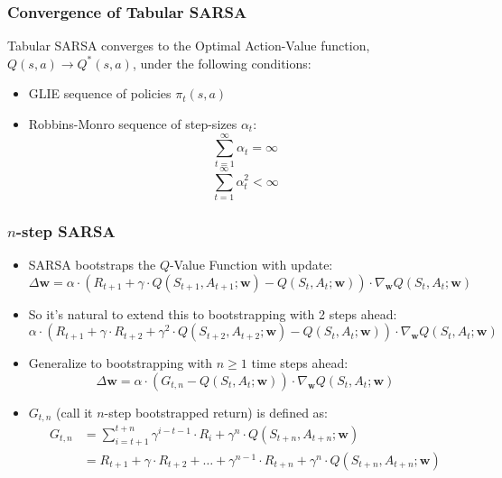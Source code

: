 \documentclass[handout]{beamer}
\begin{document}
\begin{frame}
\frametitle{Convergence of Tabular SARSA}
\pause
\begin{theorem}
Tabular SARSA converges to the Optimal Action-Value function, $Q(s,a) \rightarrow Q^*(s,a)$, under the following conditions:
\pause
\begin{itemize}[<+->]
\item GLIE sequence of policies $\pi_t(s,a)$
\item Robbins-Monro sequence of step-sizes $\alpha_t$:
$$\sum_{t=1}^{\infty} \alpha_t = \infty$$
$$\sum_{t=1}^{\infty} \alpha_t^2 < \infty$$
\end{itemize}
\end{theorem}
\end{frame}


\begin{frame}
\frametitle{$n$-step SARSA}
\pause
\begin{itemize}[<+->]
\item SARSA bootstraps the $Q$-Value Function with update:
$$\Delta \bm{w} =  \alpha \cdot (R_{t+1} + \gamma \cdot Q(S_{t+1}, A_{t+1}; \bm{w}) - Q(S_t,A_t; \bm{w})) \cdot \nabla_{\bm{w}} Q(S_t, A_t; \bm{w})$$
\item So it's natural to extend this to bootstrapping with 2 steps ahead:
$$\alpha \cdot (R_{t+1} + \gamma \cdot R_{t+2} + \gamma^2 \cdot Q(S_{t+2}, A_{t+2}; \bm{w}) - Q(S_t,A_t; \bm{w})) \cdot \nabla_{\bm{w}} Q(S_t, A_t; \bm{w})$$
\item Generalize to bootstrapping with $n \geq 1$ time steps ahead:
$$\Delta \bm{w} =  \alpha \cdot (G_{t,n} - Q(S_t,A_t; \bm{w})) \cdot \nabla_{\bm{w}} Q(S_t, A_t; \bm{w})$$
\item $G_{t,n}$ (call it $n$-step bootstrapped return) is defined as:
\begin{align*}
G_{t,n} & = \sum_{i=t+1}^{t+n} \gamma^{i-t-1} \cdot R_i  + \gamma^n \cdot Q(S_{t+n}, A_{t+n}; \bm{w}) \\
& = R_{t+1} + \gamma \cdot R_{t+2} + \ldots + \gamma^{n-1} \cdot R_{t+n} + \gamma^n \cdot Q(S_{t+n}, A_{t+n}; \bm{w})
\end{align*}
\end{itemize}
\end{frame}
\end{document}
